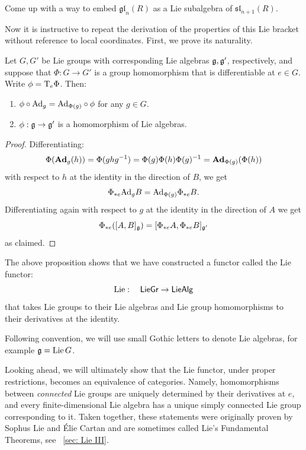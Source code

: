 \begin{xca}
    Come up with a way to embed $\mathfrak{gl}_n(R)$ as a Lie subalgebra of $\mathfrak{sl}_{n+1}(R)$.
\end{xca}

Now it is instructive to repeat the derivation of the properties of this Lie bracket without reference to local coordinates. First, we prove its naturality.

\begin{prop}\label{prop 1.1.3 DK}
    Let $G,G'$ be Lie groups with corresponding Lie algebras $\mathfrak{g},\mathfrak{g}'$, respectively, and suppose that $\Phi:G\to G'$ is a group homomorphism that is differentiable at $e\in G$. Write $\phi=\mathrm{T}_e \Phi$. Then:
    \begin{enumerate}
        \item $\phi\circ \mathrm{Ad}_g=\mathrm{Ad}_{\Phi(g)}\circ \phi$ for any $g\in G$.
        \item $\phi:\mathfrak{g}\to\mathfrak{g}'$ is a homomorphism of Lie algebras.
    \end{enumerate}
\end{prop}
\begin{proof}
    Differentiating:
    \[\Phi(\mathrm{\mathbf{Ad}}_g(h))=\Phi(ghg^{-1})=\Phi(g)\Phi(h)\Phi(g)^{-1}=\mathrm{\mathbf{Ad}}_{\Phi(g)}(\Phi(h))\]
    with respect to $h$ at the identity in the direction of $B$, we get
    \[\Phi_{\ast e} \mathrm{Ad}_g B=\mathrm{Ad}_{\Phi(g)} \Phi_{\ast e}B.\]
    Differentiating again with respect to $g$ at the identity in the direction of $A$ we get
    \[\Phi_{\ast e}([A,B]_{\mathfrak{g}})=[\Phi_{\ast e}A,\Phi_{\ast e}B]_{\mathfrak{g}'}\]
    as claimed.
\end{proof}
\begin{cor}
    The above proposition shows that we have constructed a functor called the Lie functor:
    \[\operatorname{Lie}:\quad \mathsf{LieGr}\to \mathsf{LieAlg}\]
    that takes Lie groups to their Lie algebras and Lie group homomorphisms to their derivatives at the identity.
\end{cor}

\begin{rem}
    Following convention, we will use small Gothic letters to denote Lie algebras, for example $\mathfrak{g}=\operatorname{Lie} G$.
\end{rem}

\begin{rem}
    Looking ahead, we will ultimately show that the Lie functor, under proper restrictions, becomes an equivalence of categories. Namely, homomorphisms between \emph{connected} Lie groups are uniquely determined by their derivatives at $e$, and every finite-dimensional Lie algebra has a unique simply connected Lie group corresponding to it. Taken together, these statements were originally proven by Sophus Lie and \'Elie Cartan and are sometimes called Lie's Fundamental Theorems, see \subsect~\ref{sec: Lie III}.
\end{rem}


